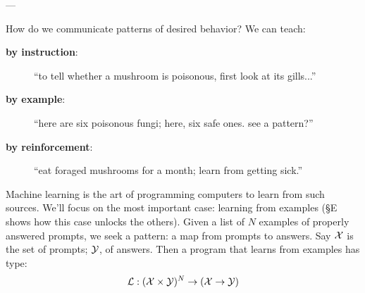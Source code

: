 \documentclass[11pt, justified]{tufte-book}
\newcommand{\samsubsubsection}[1]{
   \vspace{0.1cm}
   \par\noindent{\hspace{-2cm}\normalsize \sc \gre #1} ---
}
\theoremstyle{definition}
\begin{document}
    \samsubsubsection{kinds of learning}
      How do we communicate
      patterns of desired behavior?
      We can teach:
      \begin{description}
        \item[\textbf{by instruction}:  ]  ``to tell whether a mushroom is poisonous, first look at its gills...'' 
        \item[\textbf{by example}:      ]  ``here are six poisonous fungi; here, six safe ones.  see a pattern?''
        \item[\textbf{by reinforcement}:]  ``eat foraged mushrooms for a month; learn from getting sick.''
      \end{description}
      Machine learning is the art of programming computers to learn from such
      sources.  
      We'll focus on the most important case: learning from examples (\S E shows how this case unlocks the others).
      Given a list of $N$ examples of properly answered prompts, we
      seek a pattern: a map from prompts to answers.
      Say $\mathcal{X}$ is the set of prompts; $\mathcal{Y}$, of answers.
      Then a program that learns from examples has type:
      $$\vspace{-0.1cm}
        \lL : (\xX\times \yY)^N \to (\xX\to \yY)
      $$
\end{document}
